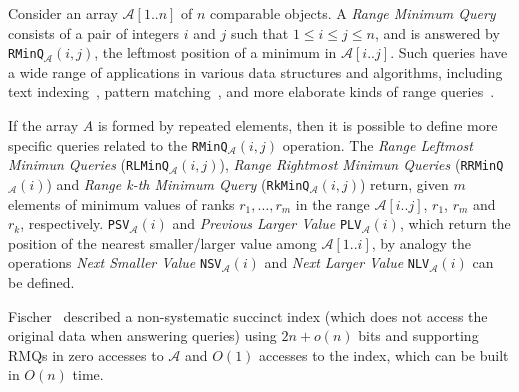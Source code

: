 Consider an array ${\mathcal{A}}[1..n]$ of $n$ comparable objects. A \emph{Range
  Minimum
  Query}~\cite{1993-SICOMP-RecursiveStarTreeParallelDataStructure-BerkmanVishkin}
consists of a pair of integers $i$ and $j$ such that
$1\le i\le j\le n$, and is answered by
\texttt{RMinQ}$_{\mathcal{A}}(i,j)$, the leftmost position of a
minimum in $\mathcal{A}[i..j]$. Such queries have a wide range of
applications in various data structures and algorithms, including text
indexing~\cite{2009-TCS-FasterEntropyBoundedCompressedSuffixTrees-FischerMakinenNavarro},
pattern
matching~\cite{2008-STACS-ImprovedAlgorithmsForTheRangeNextValueProblemAndApplications-CrochemoreIliopoulosKubicaRahmanWalen},
and more elaborate kinds of range
queries~\cite{2004-ISAAC-OnTheRangeMaximumSumSegmentQueryProblem-ChenChao}.


If the array $A$ is formed by repeated elements, then it is possible
to define more specific queries related to the
\texttt{RMinQ}$_{\mathcal{A}}(i,j)$ operation. The \emph{Range
  Leftmost Minimun Queries} (\texttt{RLMinQ}$_{\mathcal{A}}(i,j)$),
\emph{Range Rightmost Minimun Queries}
(\texttt{RRMinQ}$_{\mathcal{A}}(i)$) and \emph{Range k-th Minimum
  Query} (\texttt{RkMinQ}$_{\mathcal{A}}(i,j)$) return, given $m$
elements of minimum values of ranks $r_1, \dots, r_m$ in the range
${\mathcal{A}}[i..j]$, $r_1$, $r_m$ and $r_k$, respectively.
\texttt{PSV}$_{\mathcal{A}}(i)$ and \emph{Previous Larger Value}
\texttt{PLV}$_{\mathcal{A}}(i)$, which return the position of the nearest
smaller/larger value among ${\mathcal{A}}[1..i]$, by analogy the operations
\emph{Next Smaller Value} \texttt{NSV}$_{\mathcal{A}}(i)$ and \emph{Next Larger Value}
\texttt{NLV}$_{\mathcal{A}}(i)$ can be defined.

Fischer~\cite{2010-LATIN-OptimalSuccinctnessForRangeMinimumQueries-Fischer}
described a non-systematic succinct index (which does not access the
original data when answering queries) using $2n+o(n)$ bits and
supporting RMQs in zero accesses to $\mathcal{A}$ and $O(1)$ accesses to the
index, which can be built in $O(n)$ time.

